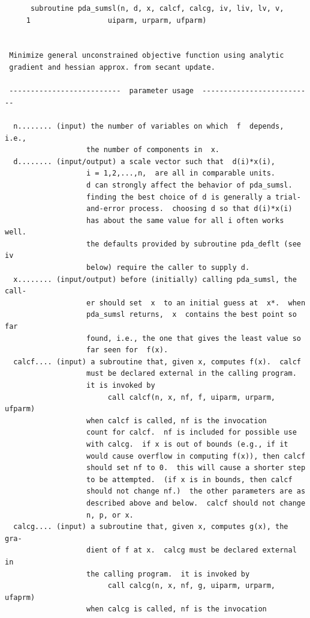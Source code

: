 \documentclass[11pt,twoside]{article}
\begin{document}
\begin{verbatim}
      subroutine pda_sumsl(n, d, x, calcf, calcg, iv, liv, lv, v,
     1                  uiparm, urparm, ufparm)


 Minimize general unconstrained objective function using analytic 
 gradient and hessian approx. from secant update.

 --------------------------  parameter usage  --------------------------
 
  n........ (input) the number of variables on which  f  depends, i.e.,
                   the number of components in  x.
  d........ (input/output) a scale vector such that  d(i)*x(i),
                   i = 1,2,...,n,  are all in comparable units.
                   d can strongly affect the behavior of pda_sumsl.
                   finding the best choice of d is generally a trial-
                   and-error process.  choosing d so that d(i)*x(i)
                   has about the same value for all i often works well.
                   the defaults provided by subroutine pda_deflt (see iv
                   below) require the caller to supply d.
  x........ (input/output) before (initially) calling pda_sumsl, the call-
                   er should set  x  to an initial guess at  x*.  when
                   pda_sumsl returns,  x  contains the best point so far
                   found, i.e., the one that gives the least value so
                   far seen for  f(x).
  calcf.... (input) a subroutine that, given x, computes f(x).  calcf
                   must be declared external in the calling program.
                   it is invoked by
                        call calcf(n, x, nf, f, uiparm, urparm, ufparm)
                   when calcf is called, nf is the invocation
                   count for calcf.  nf is included for possible use
                   with calcg.  if x is out of bounds (e.g., if it
                   would cause overflow in computing f(x)), then calcf
                   should set nf to 0.  this will cause a shorter step
                   to be attempted.  (if x is in bounds, then calcf
                   should not change nf.)  the other parameters are as
                   described above and below.  calcf should not change
                   n, p, or x.
  calcg.... (input) a subroutine that, given x, computes g(x), the gra-
                   dient of f at x.  calcg must be declared external in
                   the calling program.  it is invoked by
                        call calcg(n, x, nf, g, uiparm, urparm, ufaprm)
                   when calcg is called, nf is the invocation

\end{verbatim}
\end{document}
